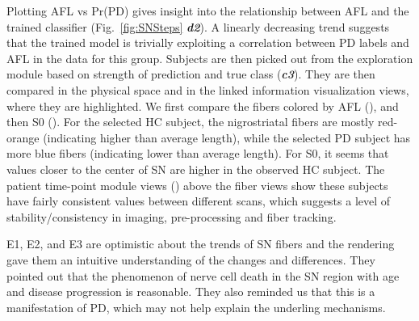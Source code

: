 Plotting AFL vs Pr(PD) gives insight into the relationship between AFL and the trained classifier (Fig.~\ref{fig:SNSteps}  \textbf{\textit{d2}}). A linearly decreasing trend suggests that the trained model is trivially exploiting a correlation between PD labels and AFL in the data for this group. Subjects are then picked out from the exploration module based on strength of prediction and true class (\textbf{\textit{c3}}). They are then compared in the physical space and in the linked information visualization views, where they are highlighted. We first compare the fibers colored by AFL (), and then S0 (). For the selected HC subject, the nigrostriatal fibers are mostly red-orange (indicating higher than average length), while the selected PD subject has more blue fibers (indicating lower than average length). For S0, it seems that values closer to the center of SN are higher in the observed HC subject. The patient time-point module views () above the fiber views show these subjects have fairly consistent values between different scans, which suggests a level of stability/consistency in imaging, pre-processing and fiber tracking. 

E1, E2, and E3 are optimistic about the trends of SN fibers and the rendering gave them an intuitive understanding of the changes and differences. They pointed out that the phenomenon of nerve cell death in the SN region with age and disease progression is reasonable. They also reminded us that this is a manifestation of PD, which may not help explain the underling mechanisms.



